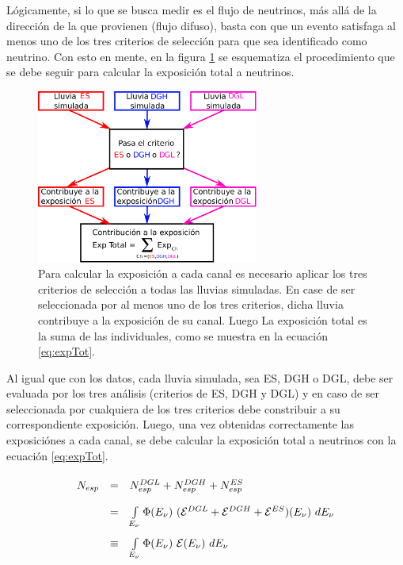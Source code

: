	L\'ogicamente, si lo que se busca medir es el flujo de neutrinos, m\'as all\'a de la dirección de la que provienen (flujo difuso), basta con que un evento satisfaga al menos uno de los tres criterios de selección para que sea identificado como neutrino.
	Con esto en mente, en la figura \ref{fig:sketch_combined} se esquematiza el procedimiento que se debe seguir para calcular la exposición total a neutrinos.
	\begin{figure}[ht!]
		\begin{center}
			\includegraphics[width=0.65\textwidth]{fig/resultadosAuger/sketch_combined_5}
			\caption{Para calcular la exposición a cada canal es necesario aplicar los tres criterios de selección a todas las lluvias simuladas. En case de ser seleccionada por al menos uno de los tres criterios, dicha lluvia contribuye a la exposición de su canal. Luego La exposición total es la suma de las individuales, como se muestra en la ecuación \ref{eq:expTot}.}
			\label{fig:sketch_combined}
		\end{center}
	\end{figure}
	Al igual que con los datos, cada lluvia simulada, sea ES, DGH o DGL, debe ser evaluada por los tres análisis (criterios de ES, DGH y DGL) y en caso de ser seleccionada por cualquiera de los tres criterios debe constribuir a su correspondiente exposición.
	Luego, una vez obtenidas correctamente las exposiciónes a cada canal, se debe calcular la exposición total a neutrinos con la ecuación \ref{eq:expTot}.
	\begin{equation}\renewcommand{\arraystretch}{2}
	\begin{array}{rcl}
	 N_{esp}& =& N_{esp}^{DGL}+N_{esp}^{DGH}+N_{esp}^{ES} \\
	 & = & \int\limits_{E_\nu}\Phi(E_\nu)~({\cal E}^{DGL}+{\cal E}^{DGH}+{\cal E}^{ES})(E_\nu)~dE_\nu\\
	 & \equiv & \int\limits_{E_\nu}\Phi(E_\nu)~{\cal E}(E_\nu)~dE_\nu
	\end{array}
	\label{eq:expTot}
	\end{equation}
	
